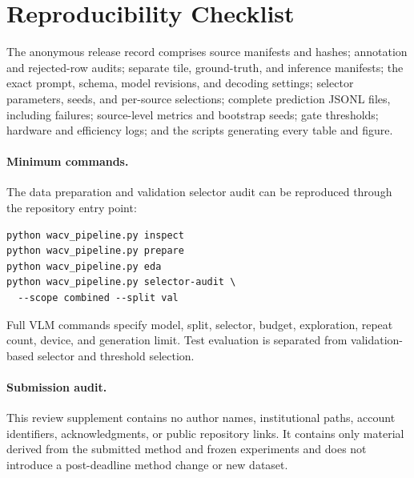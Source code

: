 \section{Reproducibility Checklist}
\label{sec:repro}

The anonymous release record comprises source manifests and hashes; annotation
and rejected-row audits; separate tile, ground-truth, and inference manifests;
the exact prompt, schema, model revisions, and decoding settings; selector
parameters, seeds, and per-source selections; complete prediction JSONL files,
including failures; source-level metrics and bootstrap seeds; gate thresholds;
hardware and efficiency logs; and the scripts generating every table and
figure.

\paragraph{Minimum commands.}
The data preparation and validation selector audit can be reproduced through
the repository entry point:
\begin{verbatim}
python wacv_pipeline.py inspect
python wacv_pipeline.py prepare
python wacv_pipeline.py eda
python wacv_pipeline.py selector-audit \
  --scope combined --split val
\end{verbatim}
Full VLM commands specify model, split, selector, budget, exploration, repeat
count, device, and generation limit.  Test evaluation is separated from
validation-based selector and threshold selection.

\paragraph{Submission audit.}
This review supplement contains no author names, institutional paths, account
identifiers, acknowledgments, or public repository links.  It contains only
material derived from the submitted method and frozen experiments and does not
introduce a post-deadline method change or new dataset.
